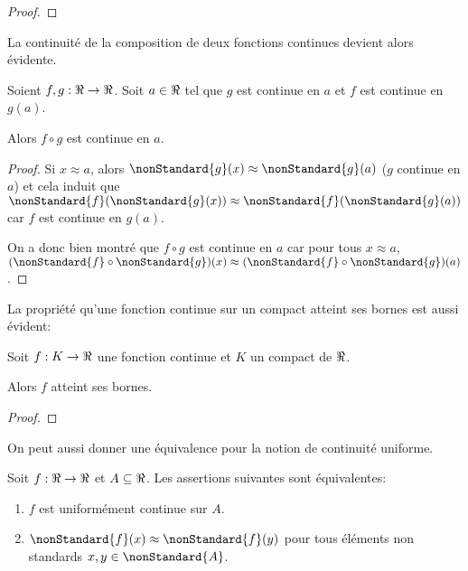 \documentclass[a4paper, 12pt]{report}
\begin{document}
\ifdefined\outputproof
\begin{proof}

\end{proof}
\fi

La continuité de la composition de deux fonctions continues devient alors
évidente.

\begin{proposition}
	Soient $f, g : \real \rightarrow \real$. Soit $a \in \real$ tel que $g$ est
	continue en $a$ et $f$ est continue en $g(a)$.

	Alors $f \circ g$ est continue en $a$.
\end{proposition}

\ifdefined\outputproof
\begin{proof}
	Si $x \approx a$, alors $\nonStandard{g}(x) \approx \nonStandard{g}(a)$ ($g$
	continue en $a$) et
	cela induit que $\nonStandard{f}(\nonStandard{g}(x))
	\approx \nonStandard{f}(\nonStandard{g}(a))$ car $f$ est continue en $g(a)$.

	On a donc bien montré que $f \circ g$ est continue en $a$ car pour tous $x \approx
	a$, $(\nonStandard{f} \circ \nonStandard{g}) (x) \approx (\nonStandard{f}
	\circ \nonStandard{g})(a)$.
\end{proof}
\fi

La propriété qu'une fonction continue sur un compact atteint ses bornes est
aussi évident:

\begin{proposition}
	Soit $f : K \rightarrow \real$ une fonction continue et $K$ un compact de
	$\real$.

	Alors $f$ atteint ses bornes.
\end{proposition}

\ifdefined\outputproof
\begin{proof}

\end{proof}
\fi

On peut aussi donner une équivalence pour la notion de continuité uniforme.

\begin{proposition}
	Soit $f : \real \rightarrow \real$ et $A \subseteq \real$. Les assertions
	suivantes sont équivalentes:

	\begin{enumerate}
		\item $f$ est uniformément continue sur $A$.
		\item $\nonStandard{f}(x) \approx \nonStandard{f}(y)$ pour tous éléments
			non standards $x, y \in \nonStandard{A}$.
	\end{enumerate}
\end{proposition}
\end{document}
